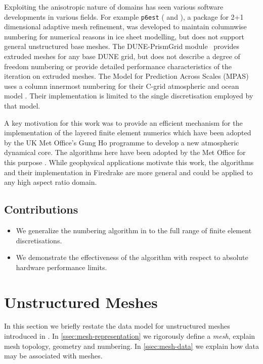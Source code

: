 \documentclass[11pt, a4paper]{scrartcl}
\begin{document}
Exploiting the anisotropic nature of domains has seen various software
developments in various fields.  For example \texttt{p6est}
(\citet{Isaac:2015} and \citet[\S 2.3]{Isaac:2015a}), a package for 2+1
dimensional adaptive mesh refinement, was developed to maintain
columnwise numbering for numerical reasons in ice sheet modelling, but
does not support general unstructured base meshes.  The DUNE-PrismGrid
module~\citep{Gersbacher:2012} provides extruded meshes for any base
DUNE grid, but does not describe a degree of freedom numbering or
provide detailed performance characteristics of the iteration on
extruded meshes.  The Model for Prediction Across Scales (MPAS) uses a
column innermost numbering for their C-grid atmospheric and ocean
model \citep{Sarje:2015}.  Their implementation is limited to the
single discretisation employed by that model.


A key motivation for this work was to provide an efficient mechanism
for the implementation of the layered finite element numerics which
have been adopted by the UK Met Office's Gung Ho programme to develop
a new atmospheric dynamical core. The algorithms here have been
adopted by the Met Office for this purpose \citep{Ford:2013}.  While
geophysical applications motivate this work, the algorithms and their
implementation in Firedrake \citep{Rathgeber:2016} are more general and
could be applied to any high aspect ratio domain.

\subsection{Contributions}
\label{ssec:contributions}
\begin{itemize}
\item We generalize the numbering algorithm in \citet{Macdonald:2011} to the
  full range of finite element discretisations.
\item We demonstrate the effectiveness of the algorithm with respect
  to absolute hardware performance limits.
\end{itemize}

\section{Unstructured Meshes}
\label{sec:unstructured-meshes}

In this section we briefly restate the data model for unstructured
meshes introduced in \citet{Logg:2009,Knepley:2009}. In
\autoref{ssec:mesh-representation} we rigorously define a \emph{mesh},
explain mesh topology, geometry and numbering. In
\autoref{ssec:mesh-data} we explain how data may be associated with
meshes.
\end{document}
